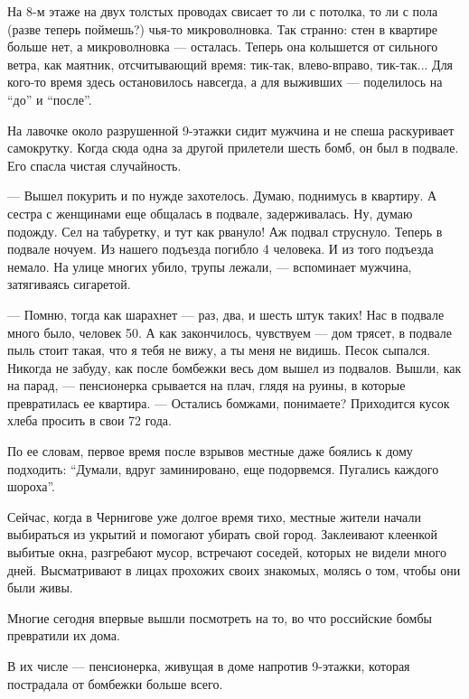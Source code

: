 На 8-м этаже на двух толстых проводах свисает то ли с потолка, то ли с пола
(разве теперь поймешь?) чья-то микроволновка. Так странно: стен в квартире
больше нет, а микроволновка — осталась. Теперь она колышется от сильного ветра,
как маятник, отсчитывающий время: тик-так, влево-вправо, тик-так... Для кого-то
время здесь остановилось навсегда, а для выживших — поделилось на \enquote{до} и
\enquote{после}. 


На лавочке около разрушенной 9-этажки сидит мужчина и не спеша раскуривает
самокрутку. Когда сюда одна за другой прилетели шесть бомб, он был в подвале.
Его спасла чистая случайность. 

— Вышел покурить и по нужде захотелось. Думаю, поднимусь в квартиру. А сестра с
женщинами еще общалась в подвале, задерживалась. Ну, думаю подожду. Сел на
табуретку, и тут как рвануло! Аж подвал струснуло. Теперь в подвале ночуем. Из
нашего подъезда погибло 4 человека. И из того подъезда немало. На улице многих
убило, трупы лежали, — вспоминает мужчина, затягиваясь сигаретой.

— Помню, тогда как шарахнет — раз, два, и шесть штук таких! Нас в подвале много
было, человек 50. А как закончилось, чувствуем — дом трясет, в подвале пыль
стоит такая, что я тебя не вижу, а ты меня не видишь. Песок сыпался. Никогда не
забуду, как после бомбежки весь дом вышел из подвалов. Вышли, как на парад, —
пенсионерка срывается на плач, глядя на руины, в которые превратилась ее
квартира. — Остались бомжами, понимаете? Приходится кусок хлеба просить в свои
72 года. 

По ее словам, первое время после взрывов местные даже боялись к дому подходить:
\enquote{Думали, вдруг заминировано, еще подорвемся. Пугались каждого шороха}. 

Сейчас, когда в Чернигове уже долгое время тихо, местные жители начали
выбираться из укрытий и помогают убирать свой город. Заклеивают клеенкой
выбитые окна, разгребают мусор, встречают соседей, которых не видели много
дней. Высматривают в лицах прохожих своих знакомых, молясь о том, чтобы они
были живы.


Многие сегодня впервые вышли посмотреть на то, во что российские бомбы
превратили их дома. 

В их числе — пенсионерка, живущая в доме напротив 9-этажки, которая пострадала
от бомбежки больше всего.

